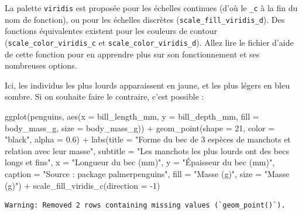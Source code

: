 \documentclass[
  a4paper,
  DIV=11,
  numbers=noendperiod,
  oneside]{scrreprt}
\newenvironment{Shaded}{}{}
\newcommand{\AttributeTok}[1]{\textcolor[rgb]{0.84,0.23,0.29}{#1}}
\newcommand{\DecValTok}[1]{\textcolor[rgb]{0.00,0.36,0.77}{#1}}
\newcommand{\FloatTok}[1]{\textcolor[rgb]{0.00,0.36,0.77}{#1}}
\newcommand{\FunctionTok}[1]{\textcolor[rgb]{0.44,0.26,0.76}{#1}}
\newcommand{\NormalTok}[1]{\textcolor[rgb]{0.14,0.16,0.18}{#1}}
\newcommand{\SpecialCharTok}[1]{\textcolor[rgb]{0.00,0.36,0.77}{#1}}
\newcommand{\StringTok}[1]{\textcolor[rgb]{0.01,0.18,0.38}{#1}}
\begin{document}
La palette \texttt{viridis} est proposée pour les échelles continues
(d'où le \texttt{\_c} à la fin du nom de fonction), ou pour les échelles
discrètes (\texttt{scale\_fill\_viridis\_d}). Des fonctions équivalentes
existent pour les couleurs de contour (\texttt{scale\_color\_viridis\_c}
et \texttt{scale\_color\_viridis\_d}). Allez lire le fichier d'aide de
cette fonction pour en apprendre plus sur son fonctionnement et ses
nombreuses options.

Ici, les individus les plus lourds apparaissent en jaune, et les plus
légers en bleu sombre. Si on souhaite faire le contraire, c'est possible
:

\begin{Shaded}
\begin{Highlighting}[]
\FunctionTok{ggplot}\NormalTok{(penguins, }\FunctionTok{aes}\NormalTok{(}\AttributeTok{x =}\NormalTok{ bill\_length\_mm, }\AttributeTok{y =}\NormalTok{ bill\_depth\_mm,}
                     \AttributeTok{fill =}\NormalTok{ body\_mass\_g, }\AttributeTok{size =}\NormalTok{ body\_mass\_g)) }\SpecialCharTok{+}
  \FunctionTok{geom\_point}\NormalTok{(}\AttributeTok{shape =} \DecValTok{21}\NormalTok{, }\AttributeTok{color =} \StringTok{"black"}\NormalTok{, }\AttributeTok{alpha =} \FloatTok{0.6}\NormalTok{) }\SpecialCharTok{+}
  \FunctionTok{labs}\NormalTok{(}\AttributeTok{title =} \StringTok{"Forme du bec de 3 espèces de manchots et relation avec leur masse"}\NormalTok{,}
       \AttributeTok{subtitle =} \StringTok{"Les manchots les plus lourds ont des becs longs et fins"}\NormalTok{,}
       \AttributeTok{x =} \StringTok{"Longueur du bec (mm)"}\NormalTok{,}
       \AttributeTok{y =} \StringTok{"Épaisseur du bec (mm)"}\NormalTok{,}
       \AttributeTok{caption =} \StringTok{"Source :  package \textquotesingle{}palmerpenguins\textquotesingle{}"}\NormalTok{,}
       \AttributeTok{fill =} \StringTok{"Masse (g)"}\NormalTok{,}
       \AttributeTok{size =} \StringTok{"Masse (g)"}\NormalTok{) }\SpecialCharTok{+}
  \FunctionTok{scale\_fill\_viridis\_c}\NormalTok{(}\AttributeTok{direction =} \SpecialCharTok{{-}}\DecValTok{1}\NormalTok{)}
\end{Highlighting}
\end{Shaded}

\begin{verbatim}
Warning: Removed 2 rows containing missing values (`geom_point()`).
\end{verbatim}
\end{document}
